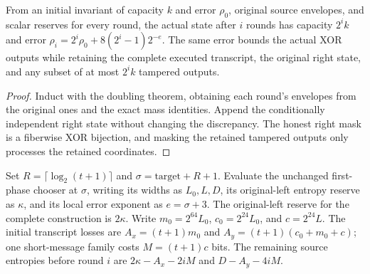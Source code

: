 \begin{theorem}
  \label{thm:lowerbounds-algebraic-affine-iteration-invariant}
  \leanok
  From an initial invariant of capacity $k$ and error $\rho_0$, original
  source envelopes, and scalar reserves for every round, the actual state
  after $i$ rounds has capacity $2^ik$ and error
  $\rho_i=2^i\rho_0+8(2^i-1)2^{-e}$.
  The same error bounds the actual XOR outputs while retaining the
  complete executed transcript, the original right state, and any subset
  of at most $2^ik$ tampered outputs.
\end{theorem}
\begin{proof}
  \leanok
  Induct with the doubling theorem, obtaining each round's envelopes
  from the original ones and the exact mass identities. Append the
  conditionally independent right state without changing the discrepancy.
  The honest right mask is a fiberwise XOR bijection, and masking the
  retained tampered outputs only processes the retained coordinates.
\end{proof}

\begin{definition}
  \label{def:lowerbounds-algebraic-affine-iteration-parameters}
  \leanok
  Set $R=\lceil\log_2(t+1)\rceil$ and
  $\sigma=\mathrm{target}+R+1$. Evaluate the unchanged first-phase chooser
  at $\sigma$, writing its widths as $L_0,L,D$, its original-left entropy
  reserve as $\kappa$, and its local error exponent as $e=\sigma+3$.
  The original-left reserve for the complete construction is $2\kappa$.
  Write $m_0=2^{64}L_0$, $c_0=2^{24}L_0$, and $c=2^{24}L$.
  The initial transcript losses are $A_x=(t+1)m_0$ and
  $A_y=(t+1)(c_0+m_0+c)$; one short-message family costs $M=(t+1)c$ bits.
  The remaining source entropies before round $i$ are
  $2\kappa-A_x-2iM$ and $D-A_y-4iM$.
\end{definition}

